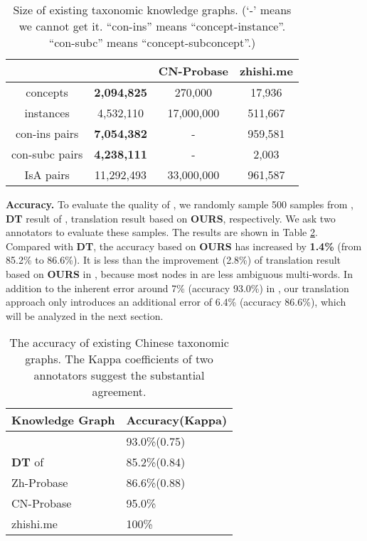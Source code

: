\begin{table}[ht]
\caption{Size of existing taxonomic knowledge graphs. (`-' means we cannot get it. ``con-ins'' means ``concept-instance''. ``con-subc'' means ``concept-subconcept''.)}
\label{tab:zh_probase_coverage}
\centering
\begin{tabular}{cccc}\hline
	\textbf{}&\textbf{\zhpro}&\textbf{CN-Probase}&\textbf{zhishi.me}\\ \hline
	concepts  &\textbf{2,094,825}&270,000&17,936\\
	instances  &4,532,110&17,000,000&511,667\\
	con-ins pairs &\textbf{7,054,382}&-&959,581\\
	con-subc pairs&\textbf{4,238,111}&-&2,003\\
	IsA pairs&11,292,493&33,000,000&961,587 \\ \hline
	\end{tabular}
\end{table}

\textbf{Accuracy.}	
To evaluate the quality of \zhpro, 
we randomly sample 500 samples from \pro, \textbf{DT} result of \pro, translation result based on \textbf{OURS}, respectively.
We ask two annotators to evaluate these samples. 
The results are shown in Table \ref{tab:probase_accuracy}. 
Compared with \textbf{DT}, the accuracy based on \textbf{OURS} has increased by \textbf{1.4\%} (from 85.2\% to 86.6\%).
It is less than the improvement (2.8\%) of translation result based on \textbf{OURS} in
\zhcon, because most nodes in \pro are less ambiguous multi-words.
In addition to the inherent error around 7\% (accuracy 93.0\%) in \pro, our translation approach only introduces an additional error of 6.4\% (accuracy 86.6\%), which will be analyzed in the next section. 
\begin{table}[ht]
\caption{The accuracy of existing Chinese taxonomic graphs. The Kappa coefficients of two annotators suggest the substantial agreement.  }
\label{tab:probase_accuracy}
\centering
\begin{tabular}{ll}\hline
	\textbf{Knowledge Graph} & \textbf{Accuracy(Kappa)} \\ \hline 
	\pro    & 93.0\%(0.75) \\ 
	\textbf{DT} of \pro    & 85.2\%(0.84) \\ 
	Zh-Probase & 86.6\%(0.88) \\ 
	CN-Probase     & 95.0\% \\ 
	zhishi.me     & 100\% \\ \hline
\end{tabular}
\end{table}

